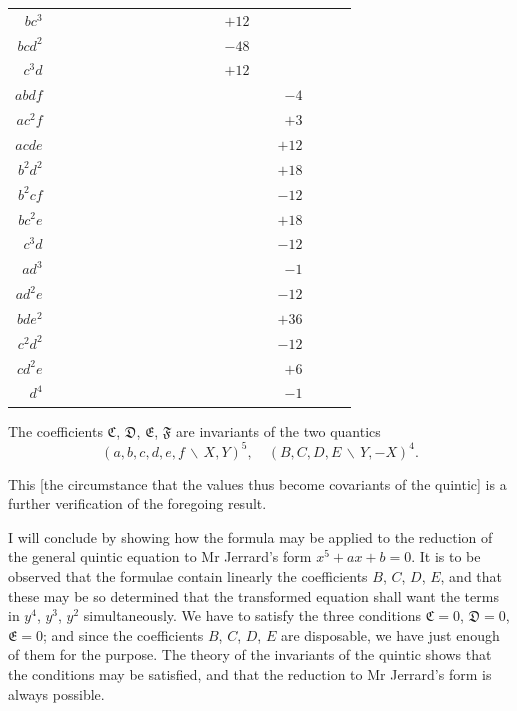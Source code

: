 \documentclass[11pt,a4paper]{book}
\begin{document}
\begin{center}
\begin{tabular}{r|rrrrrrrrrrrrrrrrrr}
$bc^{3}$ & & & & & & & & & & & & & $+12$ \\
$bcd^{2}$ & & & & & & & & & & & & & $-48$ \\
$c^{3}d$ & & & & & & & & & & & & & $+12$ \\
$abdf$ & & & & & & & & & & & & & & & $-4$ \\
$ac^{2}f$ & & & & & & & & & & & & & & & $+3$ \\
$acde$ & & & & & & & & & & & & & & & $+12$ \\
$b^{2}d^{2}$ & & & & & & & & & & & & & & & $+18$ \\
$b^{2}cf$ & & & & & & & & & & & & & & & $-12$ \\
$bc^{2}e$ & & & & & & & & & & & & & & & $+18$ \\
$c^{3}d$ & & & & & & & & & & & & & & & $-12$ \\
$ad^{3}$ & & & & & & & & & & & & & & & $-1$ \\
$ad^{2}e$ & & & & & & & & & & & & & & & $-12$ \\
$bde^{2}$ & & & & & & & & & & & & & & & $+36$ \\
$c^{2}d^{2}$ & & & & & & & & & & & & & & & $-12$ \\
$cd^{2}e$ & & & & & & & & & & & & & & & $+6$ \\
$d^{4}$ & & & & & & & & & & & & & & & $-1$
\end{tabular}
\normalsize
\end{center}

The coefficients $\mathfrak{C}$, $\mathfrak{D}$, $\mathfrak{E}$, $\mathfrak{F}$ are invariants
of the two quantics
\[(a,b,c,d,e,f\,\backslash\!\!\,X,Y)^{5}, \quad (B,C,D,E\,\backslash\!\!\,Y,-X)^{4}.\]

This [the circumstance that the values thus become covariants of the quintic] is a
further verification of the foregoing result.

I will conclude by showing how the formula may be applied to the reduction of the
general quintic equation to Mr Jerrard's form $x^{5}+ax+b=0$. It is to be observed that
the formulae contain linearly the coefficients $B$, $C$, $D$, $E$, and that these may be
so determined that the transformed equation shall want the terms in $y^{4}$, $y^{3}$, $y^{2}$
simultaneously. We have to satisfy the three conditions $\mathfrak{C}=0$, $\mathfrak{D}=0$,
$\mathfrak{E}=0$; and since the coefficients $B$, $C$, $D$, $E$ are disposable, we have
just enough of them for the purpose. The theory of the invariants of the quintic shows
that the conditions may be satisfied, and that the reduction to Mr Jerrard's form is
always possible.
\end{document}
